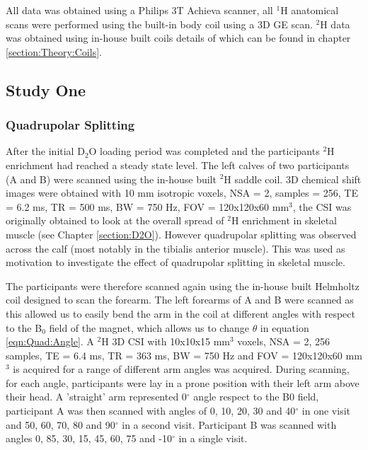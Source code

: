 \documentclass[class=article, crop=false]{standalone}
\begin{document}
All data was obtained using a Philips 3T Achieva scanner, all $^1$H anatomical scans were performed using the built-in body coil using a 3D GE scan. $^2$H data was obtained using in-house built coils details of which can be found in chapter \ref{section:Theory:Coils}. 

\subsection{Study One}
\subsubsection{Quadrupolar Splitting}
\label{Chap:Quad:1:Split}

After the initial D$_2$O loading period was completed and the participants $^2$H enrichment had reached a steady state level. The left calves of two participants (A and B) were scanned using the in-house built $^2$H saddle coil. 3D chemical shift images were obtained with 10 mm isotropic voxels, NSA = 2, samples = 256, TE = 6.2 ms, TR = 500 ms, BW = 750 Hz, FOV = 120x120x60 mm$^3$, the CSI was originally obtained to look at the overall spread of $^2$H enrichment in skeletal muscle (see Chapter \ref{section:D2O}). However quadrupolar splitting was observed across the calf (most notably in the tibialis anterior muscle). This was used as motivation to investigate the effect of quadrupolar splitting in skeletal muscle.

The participants were therefore scanned again using the in-house built Helmholtz coil designed to scan the forearm. The left forearms of A and B were scanned as this allowed us to easily bend the arm in the coil at different angles with respect to the B$_0$ field of the magnet, which allows us to change $\theta$ in equation \ref{eqn:Quad:Angle}. A $^2$H 3D CSI with 10x10x15 mm$^3$ voxels, NSA = 2, 256 samples, TE = 6.4 ms, TR = 363 ms, BW = 750 Hz and FOV = 120x120x60 mm$^3$ is acquired for a range of different arm angles was acquired. During scanning, for each angle, participants were lay in a prone position with their left arm above their head. A 'straight' arm represented  0$^{\circ}$ angle respect to the B0 field, participant A was then scanned with angles of 0, 10, 20, 30 and 40$^{\circ}$ in one visit and 50, 60, 70, 80 and 90$^{\circ}$ in a second visit. Participant B was scanned with angles 0, 85, 30, 15, 45, 60, 75 and -10$^{\circ}$ in a single visit. 
\end{document}

